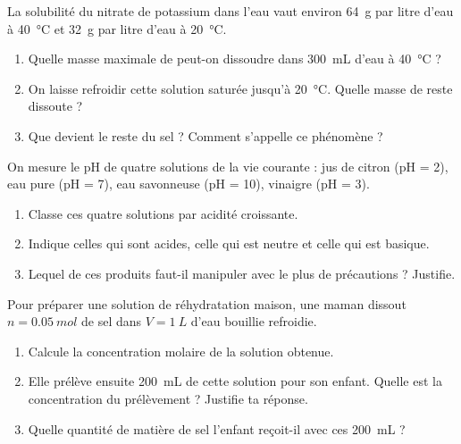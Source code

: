 \documentclass[11pt]{article}
\begin{document}
\begin{exercice}
La solubilité du nitrate de potassium  dans l'eau vaut environ \SI{64}{g} par litre d'eau à \SI{40}{\celsius} et \SI{32}{g} par litre d'eau à \SI{20}{\celsius}.

\begin{enumerate}
\item Quelle masse maximale de  peut-on dissoudre dans \SI{300}{mL} d'eau à \SI{40}{\celsius} ?
\item On laisse refroidir cette solution saturée jusqu'à \SI{20}{\celsius}. Quelle masse de  reste dissoute ?
\item Que devient le reste du sel ? Comment s'appelle ce phénomène ?
\end{enumerate}
\end{exercice}

\begin{exercice}
On mesure le pH de quatre solutions de la vie courante : jus de citron (pH = 2), eau pure (pH = 7), eau savonneuse (pH = 10), vinaigre (pH = 3).

\begin{enumerate}
\item Classe ces quatre solutions par acidité croissante.
\item Indique celles qui sont acides, celle qui est neutre et celle qui est basique.
\item Lequel de ces produits faut-il manipuler avec le plus de précautions ? Justifie.
\end{enumerate}
\end{exercice}

\begin{exercice}
Pour préparer une solution de réhydratation maison, une maman dissout $n = \SI{0,05}{mol}$ de sel dans $V = \SI{1}{L}$ d'eau bouillie refroidie.

\begin{enumerate}
\item Calcule la concentration molaire de la solution obtenue.
\item Elle prélève ensuite \SI{200}{mL} de cette solution pour son enfant. Quelle est la concentration du prélèvement ? Justifie ta réponse.
\item Quelle quantité de matière de sel l'enfant reçoit-il avec ces \SI{200}{mL} ?
\end{enumerate}
\end{exercice}
\end{document}
